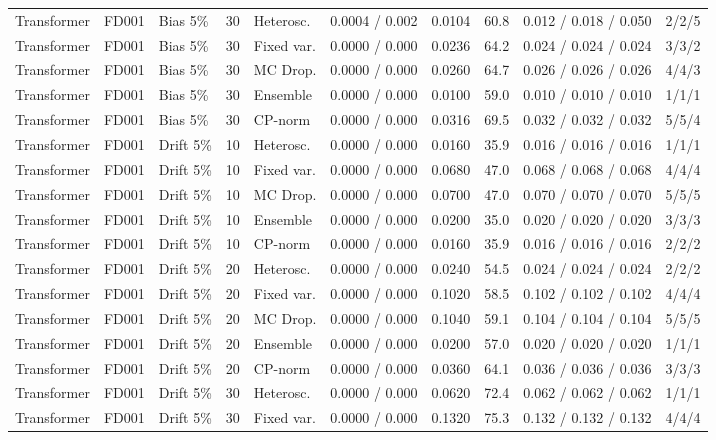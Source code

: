 \documentclass[10pt,a4paper]{article}
\begin{document}
\begin{landscape}
\begin{center}
\begin{longtable}{lllllcclll}
Transformer & FD001 & Bias 5\% & 30 & Heterosc. & 0.0004 / 0.002 & 0.0104 & 60.8 & 0.012 / 0.018 / 0.050 & 2/2/5 \\
Transformer & FD001 & Bias 5\% & 30 & Fixed var. & 0.0000 / 0.000 & 0.0236 & 64.2 & 0.024 / 0.024 / 0.024 & 3/3/2 \\
Transformer & FD001 & Bias 5\% & 30 & MC Drop. & 0.0000 / 0.000 & 0.0260 & 64.7 & 0.026 / 0.026 / 0.026 & 4/4/3 \\
Transformer & FD001 & Bias 5\% & 30 & Ensemble & 0.0000 / 0.000 & 0.0100 & 59.0 & 0.010 / 0.010 / 0.010 & 1/1/1 \\
Transformer & FD001 & Bias 5\% & 30 & CP-norm & 0.0000 / 0.000 & 0.0316 & 69.5 & 0.032 / 0.032 / 0.032 & 5/5/4 \\
Transformer & FD001 & Drift 5\% & 10 & Heterosc. & 0.0000 / 0.000 & 0.0160 & 35.9 & 0.016 / 0.016 / 0.016 & 1/1/1 \\
Transformer & FD001 & Drift 5\% & 10 & Fixed var. & 0.0000 / 0.000 & 0.0680 & 47.0 & 0.068 / 0.068 / 0.068 & 4/4/4 \\
Transformer & FD001 & Drift 5\% & 10 & MC Drop. & 0.0000 / 0.000 & 0.0700 & 47.0 & 0.070 / 0.070 / 0.070 & 5/5/5 \\
Transformer & FD001 & Drift 5\% & 10 & Ensemble & 0.0000 / 0.000 & 0.0200 & 35.0 & 0.020 / 0.020 / 0.020 & 3/3/3 \\
Transformer & FD001 & Drift 5\% & 10 & CP-norm & 0.0000 / 0.000 & 0.0160 & 35.9 & 0.016 / 0.016 / 0.016 & 2/2/2 \\
Transformer & FD001 & Drift 5\% & 20 & Heterosc. & 0.0000 / 0.000 & 0.0240 & 54.5 & 0.024 / 0.024 / 0.024 & 2/2/2 \\
Transformer & FD001 & Drift 5\% & 20 & Fixed var. & 0.0000 / 0.000 & 0.1020 & 58.5 & 0.102 / 0.102 / 0.102 & 4/4/4 \\
Transformer & FD001 & Drift 5\% & 20 & MC Drop. & 0.0000 / 0.000 & 0.1040 & 59.1 & 0.104 / 0.104 / 0.104 & 5/5/5 \\
Transformer & FD001 & Drift 5\% & 20 & Ensemble & 0.0000 / 0.000 & 0.0200 & 57.0 & 0.020 / 0.020 / 0.020 & 1/1/1 \\
Transformer & FD001 & Drift 5\% & 20 & CP-norm & 0.0000 / 0.000 & 0.0360 & 64.1 & 0.036 / 0.036 / 0.036 & 3/3/3 \\
Transformer & FD001 & Drift 5\% & 30 & Heterosc. & 0.0000 / 0.000 & 0.0620 & 72.4 & 0.062 / 0.062 / 0.062 & 1/1/1 \\
Transformer & FD001 & Drift 5\% & 30 & Fixed var. & 0.0000 / 0.000 & 0.1320 & 75.3 & 0.132 / 0.132 / 0.132 & 4/4/4 \\

\end{longtable}
\end{center}
\end{landscape}
\end{document}

